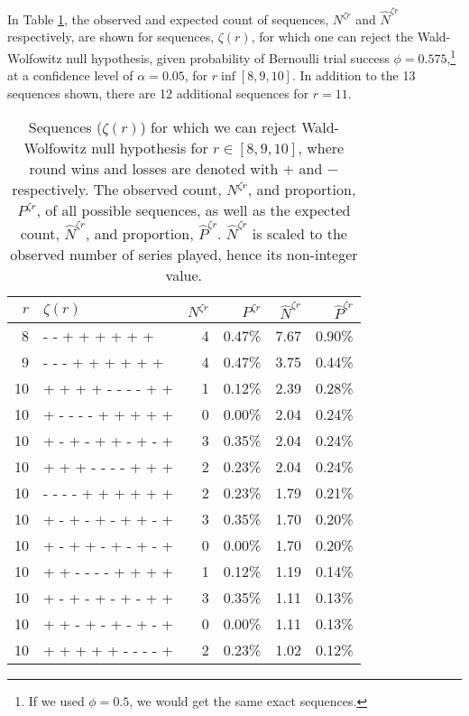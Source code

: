 \documentclass{article}
\begin{document}
In Table \ref{tbl:ww-sequences}, the observed and expected count of
sequences, \(N^{\zeta r}\) and \(\hat{N}^{\zeta r}\) respectively, are
shown for sequences, \(\zeta(r)\), for which one can reject the
Wald-Wolfowitz null hypothesis, given probability of Bernoulli trial
success \(\phi = 0.575\),\footnote{If we used \(\phi = 0.5\), we would
  get the same exact sequences.} at a confidence level of
\(\alpha = 0.05\), for \(r \inf [8, 9, 10]\). In addition to the 13
sequences shown, there are 12 additional sequences for \(r = 11\).

\begin{table}

\caption{Sequences ($\zeta(r)$) for which we can reject Wald-Wolfowitz null hypothesis for $r \in [8, 9, 10]$, where round wins and losses are denoted with $+$ and $-$ respectively. The observed count, $N^{\zeta r}$, and proportion, $P^{\zeta r}$, of all possible sequences, as well as the expected count, $\hat{N}^{\zeta r}$, and proportion, $\hat{P}^{\zeta r}$. $\hat{N}^{\zeta r}$ is scaled to the observed number of series played, hence its non-integer value.}

\centering
\begin{tabular}{rlrrrr}
\toprule
$r$ & $\zeta(r)$ & $N^{\zeta r}$ & $P^{\zeta r}$ & $\hat{N}^{\zeta r}$ & $\hat{P}^{\zeta r}$ \\ 
\midrule
8 & - - + + + + + + & 4 & 0.47\% & 7.67 & 0.90\% \\ 
9 & - - - + + + + + + & 4 & 0.47\% & 3.75 & 0.44\% \\ 
10 & + + + + - - - - + + & 1 & 0.12\% & 2.39 & 0.28\% \\ 
10 & + - - - - + + + + + & 0 & 0.00\% & 2.04 & 0.24\% \\ 
10 & + - + - + + - + - + & 3 & 0.35\% & 2.04 & 0.24\% \\ 
10 & + + + - - - - + + + & 2 & 0.23\% & 2.04 & 0.24\% \\ 
10 & - - - - + + + + + + & 2 & 0.23\% & 1.79 & 0.21\% \\ 
10 & + - + - + - + + - + & 3 & 0.35\% & 1.70 & 0.20\% \\ 
10 & + - + + - + - + - + & 0 & 0.00\% & 1.70 & 0.20\% \\ 
10 & + + - - - - + + + + & 1 & 0.12\% & 1.19 & 0.14\% \\ 
10 & + - + - + - + - + + & 3 & 0.35\% & 1.11 & 0.13\% \\ 
10 & + + - + - + - + - + & 0 & 0.00\% & 1.11 & 0.13\% \\ 
10 & + + + + + - - - - + & 2 & 0.23\% & 1.02 & 0.12\% \\ 

\bottomrule
\end{tabular}

\label{tbl:ww-sequences}
\end{table}
\end{document}
